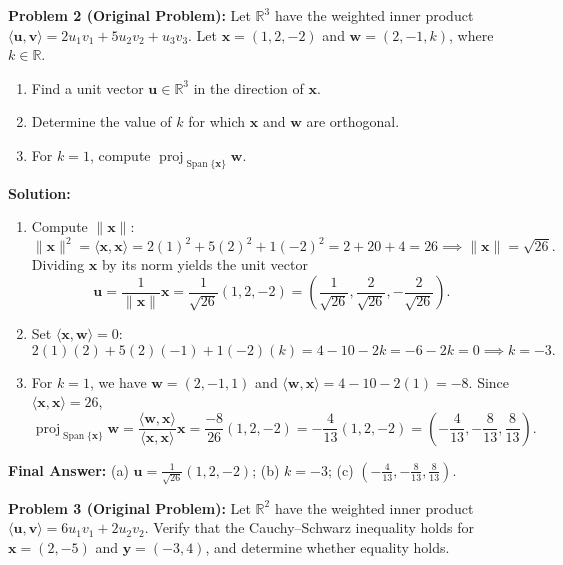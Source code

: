 \documentclass[11pt, letterpaper]{article}
\theoremstyle{definition}
\theoremstyle{remark}
\begin{document}
\medskip

\textbf{Problem 2 (Original Problem):} Let $\mathbb{R}^3$ have the weighted inner product $\langle \mathbf{u}, \mathbf{v} \rangle = 2u_1v_1 + 5u_2v_2 + u_3v_3$. Let $\mathbf{x} = (1, 2, -2)$ and $\mathbf{w} = (2, -1, k)$, where $k \in \mathbb{R}$.
\begin{enumerate}[label=(\alph*)]
    \item Find a unit vector $\mathbf{u} \in \mathbb{R}^3$ in the direction of $\mathbf{x}$.
    \item Determine the value of $k$ for which $\mathbf{x}$ and $\mathbf{w}$ are orthogonal.
    \item For $k = 1$, compute $\operatorname{proj}_{\operatorname{Span}\{\mathbf{x}\}} \mathbf{w}$.
\end{enumerate}

\textbf{Solution:}
\begin{enumerate}[label=(\alph*)]
    \item Compute $\|\mathbf{x}\|$:
    \[
    \|\mathbf{x}\|^2 = \langle \mathbf{x}, \mathbf{x} \rangle = 2(1)^2 + 5(2)^2 + 1(-2)^2 = 2 + 20 + 4 = 26 \implies \|\mathbf{x}\| = \sqrt{26}.
    \]
    Dividing $\mathbf{x}$ by its norm yields the unit vector
    \[
    \mathbf{u} = \frac{1}{\|\mathbf{x}\|}\mathbf{x} = \frac{1}{\sqrt{26}}(1, 2, -2) = \left(\frac{1}{\sqrt{26}}, \frac{2}{\sqrt{26}}, -\frac{2}{\sqrt{26}}\right).
    \]
    \item Set $\langle \mathbf{x}, \mathbf{w} \rangle = 0$:
    \[
    2(1)(2) + 5(2)(-1) + 1(-2)(k) = 4 - 10 - 2k = -6 - 2k = 0 \implies k = -3.
    \]
    \item For $k = 1$, we have $\mathbf{w} = (2, -1, 1)$ and $\langle \mathbf{w}, \mathbf{x} \rangle = 4 - 10 - 2(1) = -8$. Since $\langle \mathbf{x}, \mathbf{x} \rangle = 26$,
    \[
    \operatorname{proj}_{\operatorname{Span}\{\mathbf{x}\}} \mathbf{w} = \frac{\langle \mathbf{w}, \mathbf{x} \rangle}{\langle \mathbf{x}, \mathbf{x} \rangle}\mathbf{x} = \frac{-8}{26}(1, 2, -2) = -\frac{4}{13}(1, 2, -2) = \left(-\frac{4}{13}, -\frac{8}{13}, \frac{8}{13}\right).
    \]
\end{enumerate}
\textbf{Final Answer:} (a) $\mathbf{u} = \frac{1}{\sqrt{26}}(1, 2, -2)$; (b) $k = -3$; (c) $\left(-\frac{4}{13}, -\frac{8}{13}, \frac{8}{13}\right)$.

\medskip

\textbf{Problem 3 (Original Problem):} Let $\mathbb{R}^2$ have the weighted inner product $\langle \mathbf{u}, \mathbf{v} \rangle = 6u_1v_1 + 2u_2v_2$. Verify that the Cauchy--Schwarz inequality holds for $\mathbf{x} = (2, -5)$ and $\mathbf{y} = (-3, 4)$, and determine whether equality holds.
\end{document}

